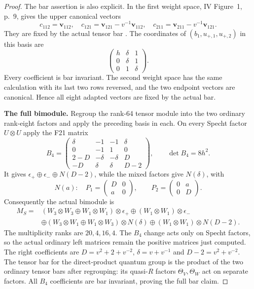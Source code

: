 \documentclass[11pt,a4paper]{article}
\renewcommand{\S}{\ensuremath{\mathsection}}
\theoremstyle{named}\newtheorem{finding}{Finding}[section]
\theoremstyle{definition}\newtheorem{definition}[finding]{Definition}
\theoremstyle{remark}\newtheorem{remark}[finding]{Remark}
\begin{document}
\begin{proof}
The bar assertion is also explicit. In the first weight space,
IV Figure~1, p.~9, gives the upper canonical vectors
\[
 c_{112}=\mathbf v_{112},\quad
 c_{121}=\mathbf v_{121}-v^{-1}\mathbf v_{112},\quad
 c_{211}=\mathbf v_{211}-v^{-1}\mathbf v_{121}.
\]
They are fixed by the actual tensor bar
\cite[\S6.2, Theorem~6.4, p.~34]{IV}.
The coordinates of $(b_1,u_{+,1},u_{+,2})$ in this basis are
\[
 \begin{pmatrix}h&\delta&1\\0&\delta&1\\0&1&\delta\end{pmatrix}.
\]
Every coefficient is bar invariant. The second weight space has
the same calculation with its last two rows reversed, and the two
endpoint vectors are canonical. Hence all eight adapted vectors
are fixed by the actual bar.

\par\smallskip\noindent\textbf{The full bimodule.}\quad
Regroup the rank-64 tensor module into the two ordinary rank-eight
factors and apply the preceding basis in each. On every Specht
factor $U\otimes U$ apply the F21 matrix
\[
 B_4=\begin{pmatrix}
 \delta&-1&-1&\delta\\0&-1&1&0\\
 2-D&-\delta&-\delta&D\\-D&\delta&\delta&D-2
 \end{pmatrix},\qquad \det B_4=8h^2.
\]
It gives $\epsilon_+\oplus\epsilon_-\oplus N(D-2)$,
while the mixed factors give $N(\delta)$, with
\[
 N(a):\quad
 P_1=\begin{pmatrix}D&0\\a&0\end{pmatrix},\qquad
 P_2=\begin{pmatrix}0&a\\0&D\end{pmatrix}.
\]
Consequently the actual bimodule is
\begin{align*}
 M_S={}&(W_3\otimes W_3\oplus W_1\otimes W_1)\otimes\epsilon_+
       \oplus(W_1\otimes W_1)\otimes\epsilon_-\\
 &\oplus(W_3\otimes W_1\oplus W_1\otimes W_3)\otimes N(\delta)
       \oplus(W_1\otimes W_1)\otimes N(D-2).
\end{align*}
The multiplicity ranks are $20,4,16,4$.
The $B_4$ change acts only on Specht factors, so the actual
ordinary left matrices remain the positive matrices just computed.
The right coefficients are $D=v^2+2+v^{-2}$,
$\delta=v+v^{-1}$ and $D-2=v^2+v^{-2}$.
The tensor bar for the direct-product quantum group is the product
of the two ordinary tensor bars after regrouping: its quasi-$R$
factors $\Theta_V,\Theta_W$ act on separate factors.
All $B_4$ coefficients are bar invariant, proving the full bar claim.


\end{proof}
\end{document}

